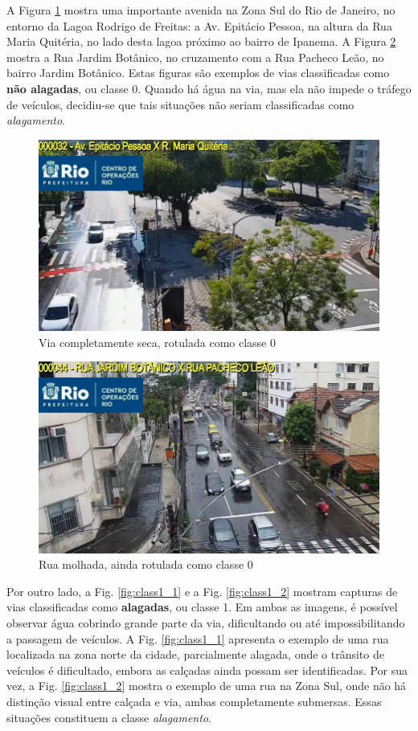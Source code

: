 A Figura \ref{fig:class0_1} mostra uma importante avenida na Zona Sul do Rio de Janeiro, no entorno da Lagoa Rodrigo de Freitas:
a Av. Epitácio Pessoa, na altura da Rua Maria Quitéria, no lado desta lagoa próximo ao bairro de Ipanema.
A Figura \ref{fig:class0_2} mostra a Rua Jardim Botânico, no cruzamento com a Rua Pacheco Leão, no bairro Jardim Botânico.
Estas figuras são exemplos de vias classificadas como \textbf{não alagadas}, ou classe 0.
Quando há água na via, mas ela não impede o tráfego de veículos, decidiu-se que tais situações não seriam classificadas como \textit{alagamento}.

\begin{figure}[htb]
\centerline{\includegraphics[width=0.8\linewidth]{images/0/CODE32 2023-02-22 08-15-04-6.jpg}}
\caption{Via completamente seca, rotulada como classe 0}
\label{fig:class0_1}
\end{figure}

\begin{figure}[htb]
\centerline{\includegraphics[width=0.8\linewidth]{images/0/CODE44 2023-08-20 13-30-31-6.jpg}}
\caption{Rua molhada, ainda rotulada como classe 0}
\label{fig:class0_2}
\end{figure}

Por outro lado, a Fig. \ref{fig:class1_1} e a Fig. \ref{fig:class1_2} mostram capturas de vias classificadas como \textbf{alagadas}, ou classe 1.
Em ambas as imagens, é possível observar água cobrindo grande parte da via, dificultando ou até impossibilitando a passagem de veículos.
A Fig. \ref{fig:class1_1} apresenta o exemplo de uma rua localizada na zona norte da cidade, parcialmente alagada, onde o trânsito de veículos é dificultado, embora as calçadas ainda possam ser identificadas.
Por sua vez, a Fig. \ref{fig:class1_2} mostra o exemplo de uma rua na Zona Sul, onde não há distinção visual entre calçada e via, ambas completamente submersas.
Essas situações constituem a classe \textit{alagamento}.

